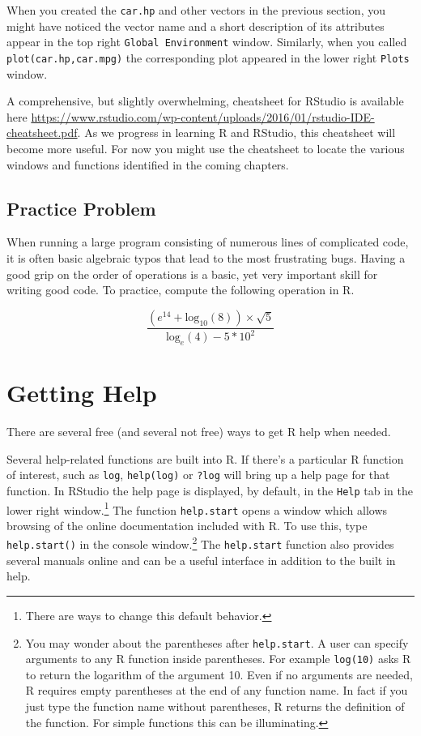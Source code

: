\documentclass[]{krantz}
\begin{document}
When you created the \texttt{car.hp} and other vectors in the previous
section, you might have noticed the vector name and a short description
of its attributes appear in the top right \texttt{Global\ Environment}
window. Similarly, when you called \texttt{plot(car.hp,car.mpg)} the
corresponding plot appeared in the lower right \texttt{Plots} window.

A comprehensive, but slightly overwhelming, cheatsheet for RStudio is
available here
\url{https://www.rstudio.com/wp-content/uploads/2016/01/rstudio-IDE-cheatsheet.pdf}.
As we progress in learning R and RStudio, this cheatsheet will become
more useful. For now you might use the cheatsheet to locate the various
windows and functions identified in the coming chapters.

\subsection{Practice Problem}\label{practice-problem}

When running a large program consisting of numerous lines of complicated
code, it is often basic algebraic typos that lead to the most
frustrating bugs. Having a good grip on the order of operations is a
basic, yet very important skill for writing good code. To practice,
compute the following operation in R.

\[
\frac{(e^{14} + \text{log}_{10}(8)) \times \sqrt{5}}{\text{log}_{e}(4) - 5 * 10^2}
\]

\section{Getting Help}\label{getting-help}

There are several free (and several not free) ways to get R help when
needed.

Several help-related functions are built into R. If there's a particular
R function of interest, such as \texttt{log}, \texttt{help(log)} or
\texttt{?log} will bring up a help page for that function. In RStudio
the help page is displayed, by default, in the \texttt{Help} tab in the
lower right window.\footnote{There are ways to change this default
  behavior.} The function \texttt{help.start} opens a window which
allows browsing of the online documentation included with R. To use
this, type \texttt{help.start()} in the console window.\footnote{You may
  wonder about the parentheses after \texttt{help.start}. A user can
  specify arguments to any R function inside parentheses. For example
  \texttt{log(10)} asks R to return the logarithm of the argument 10.
  Even if no arguments are needed, R requires empty parentheses at the
  end of any function name. In fact if you just type the function name
  without parentheses, R returns the definition of the function. For
  simple functions this can be illuminating.} The \texttt{help.start}
function also provides several manuals online and can be a useful
interface in addition to the built in help.
\end{document}

